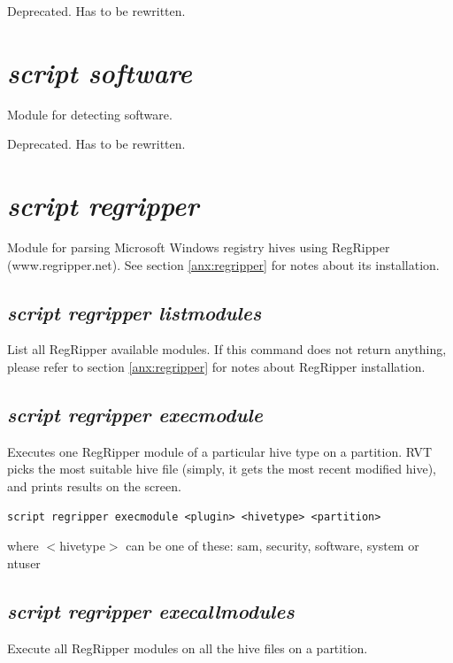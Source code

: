 \documentclass[a4paper,11pt,oneside]{report}
\begin{document}
Deprecated. Has to be rewritten.


\section{\emph{script software}}

Module for detecting software.

Deprecated. Has to be rewritten.


\section{\emph{script regripper}}

Module for parsing Microsoft Windows registry hives using RegRipper (www.regripper.net). See section \ref{anx:regripper} for notes about its installation.

\subsection{\emph{script regripper listmodules}}

List all RegRipper available modules. If this command does not return anything, please refer to section \ref{anx:regripper} for notes about RegRipper installation.



\subsection{\emph{script regripper execmodule}}

Executes one RegRipper module of a particular hive type on a partition. RVT picks the most suitable hive file (simply, it gets the most recent modified hive), and prints results on the screen.

\begin{verbatim}
script regripper execmodule <plugin> <hivetype> <partition>
\end{verbatim}

where $<$hivetype$>$ can be one of these: sam, security, software, system or ntuser



\subsection{\emph{script regripper execallmodules}}

Execute all RegRipper modules on all the hive files on a partition.
\end{document}
